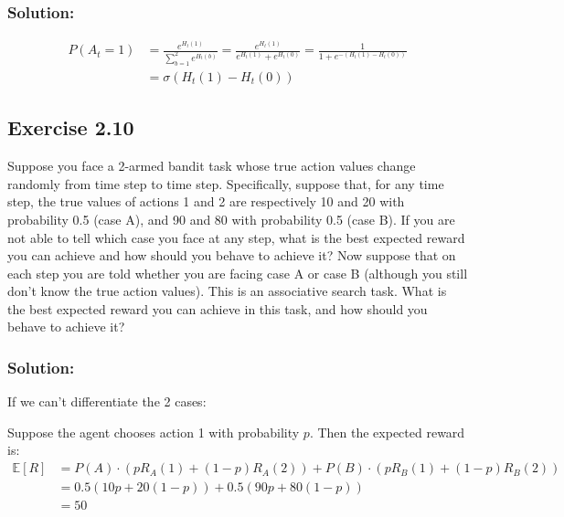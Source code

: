 \subsubsection*{Solution:}


\begin{equation}
    \begin{aligned}
        P(A_t = 1) &= \frac{e^{H_t(1)}}{\sum_{b=1}^{2} e^{H_t(b)}} = \frac{e^{H_t(1)}}{e^{H_t(1)} + e^{H_t(0)}} = \frac{1}{1 + e^{-(H_t(1)-H_t(0))}} \\
        &= \sigma(H_t(1)-H_t(0))
    \end{aligned}
\end{equation}


\subsection*{Exercise 2.10}
Suppose you face a 2-armed bandit task whose true action values change
randomly from time step to time step. Specifically, suppose that, for any time step,
the true values of actions 1 and 2 are respectively 10 and 20 with probability 0.5 (case
A), and 90 and 80 with probability 0.5 (case B). If you are not able to tell which case
you face at any step, what is the best expected reward you can achieve and how should
you behave to achieve it? Now suppose that on each step you are told whether you are
facing case A or case B (although you still don't know the true action values). This is an
associative search task. What is the best expected reward you can achieve in this task,
and how should you behave to achieve it?

\subsubsection*{Solution:}
If we can't differentiate the 2 cases:

Suppose the agent chooses action 1 with probability $p$. Then the expected reward is:
\begin{equation}
    \begin{aligned}
    \mathbb{E}[R] &= P(A) \cdot \left( p R_A(1) + (1-p)  R_A(2) \right) + 
                    P(B) \cdot \left( p R_B(1) + (1-p)  R_B(2) \right)\\
        &= 0.5 (10p + 20(1-p)) + 0.5 (90p + 80(1-p)) \\
        &= 50
    \end{aligned}
\end{equation}

